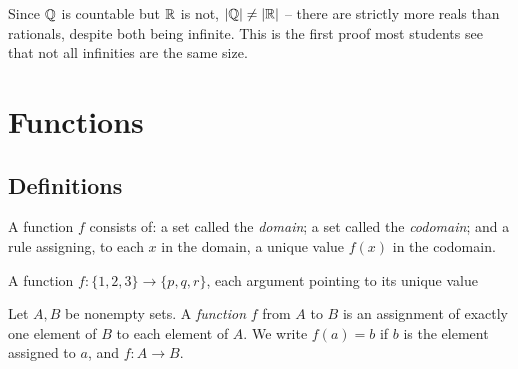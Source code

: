 \documentclass[11pt]{article}
\begin{document}
\begin{note}[Consequence]
Since $\mathbb{Q}$ is countable but $\mathbb{R}$ is not, $|\mathbb{Q}|\neq|\mathbb{R}|$ -- there are strictly more reals than rationals, despite both being infinite. This is the first proof most students see that not all infinities are the same size.
\end{note}


\newpage
\section{Functions}

\subsection{Definitions}
\label{sec:2-1}
\begin{definition}[Function]
A function $f$ consists of: a set called the \emph{domain}; a set called the \emph{codomain}; and a rule assigning, to each $x$ in the domain, a unique value $f(x)$ in the codomain.
\end{definition}

\begin{center}
\end{center}
\begin{center}
\small A function $f:\{1,2,3\}\to\{p,q,r\}$, each argument pointing to its unique value
\end{center}

\begin{definition}
Let $A,B$ be nonempty sets. A \emph{function} $f$ from $A$ to $B$ is an assignment of exactly one element of $B$ to each element of $A$. We write $f(a)=b$ if $b$ is the element assigned to $a$, and $f: A \to B$.
\end{definition}
\end{document}
